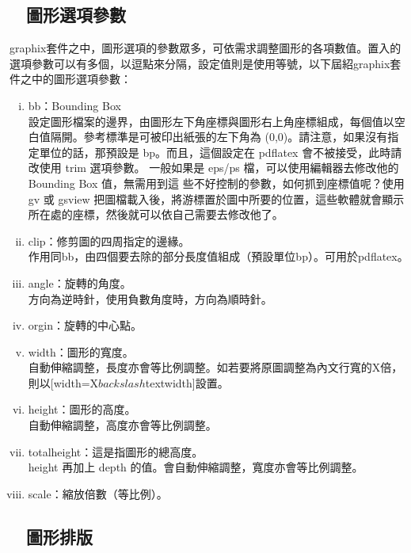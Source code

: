 \subsection{{\CB　圖形選項參數}}\label{fig_option}
	graphix套件之中，圖形選項的參數眾多，可依需求調整圖形的各項數值。置入的選項參數可以有多個，以逗點來分隔，設定值則是使用等號，以下屆紹graphix套件之中的圖形選項參數：
	\begin{enumerate}[i. ]
	\item	bb：Bounding Box \\
			設定圖形檔案的邊界，由圖形左下角座標與圖形右上角座標組成，每個值以空白值隔開。參考標準是可被印出紙張的左下角為 (0,0)。請注意，如果沒有指定單位的話，那預設是 bp。而且，這個設定在 pdflatex 會不被接受，此時請改使用 trim 選項參數。
一般如果是 eps/ps 檔，可以使用編輯器去修改他的 Bounding Box 值，無需用到這 些不好控制的參數，如何抓到座標值呢？使用 gv 或 gsview 把圖檔載入後，將游標置於圖中所要的位置，這些軟體就會顯示所在處的座標，然後就可以依自己需要去修改他了。
	\item	clip：修剪圖的四周指定的邊緣。\\
			作用同bb，由四個要去除的部分長度值組成（預設單位bp）。可用於pdflatex。
	\item	angle：旋轉的角度。 \\
			方向為逆時針，使用負數角度時，方向為順時針。
	\item 	orgin：旋轉的中心點。
	\item 	width：圖形的寬度。\\
			自動伸縮調整，長度亦會等比例調整。如若要將原圖調整為內文行寬的X倍，則以[width=X$backslash$textwidth]設置。
	\item 	height：圖形的高度。 \\
			自動伸縮調整，高度亦會等比例調整。
	\item 	totalheight：這是指圖形的總高度。\\
			height 再加上 depth 的值。會自動伸縮調整，寬度亦會等比例調整。
	\item  	scale：縮放倍數（等比例）。	
	\end{enumerate}
 	

\subsection{{\CB　圖形排版}}
